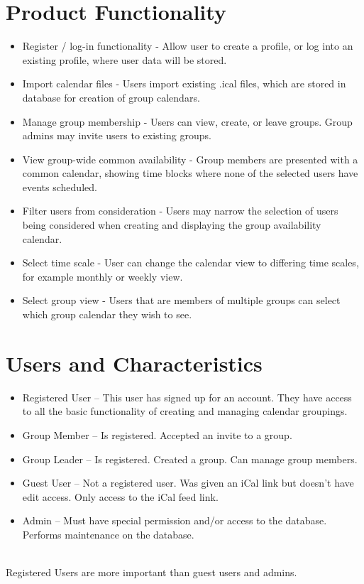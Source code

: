 \documentclass{scrreprt}
\begin{document}
\section{Product Functionality}
\begin{itemize}
\item Register / log-in functionality - Allow user to create a profile, or log
into an existing profile, where user data will be stored.
\item Import calendar files - Users import existing .ical files, which are
stored in database for creation of group calendars.
\item Manage group membership - Users can view, create, or leave groups. Group
admins may invite users to existing groups.
\item View group-wide common availability - Group members are presented with a
common calendar, showing time blocks where none of the selected users have
events scheduled.
\item Filter users from consideration - Users may narrow the selection of users
being considered when creating and displaying the group availability calendar.
\item Select time scale - User can change the calendar view to differing time 
scales, for example monthly or weekly view.
\item Select group view - Users that are members of multiple groups can select
which group calendar they wish to see.
\end{itemize}

\section{Users and Characteristics}
\begin{itemize}
    \item Registered User – This user has signed up for an account. They have access to
all the basic functionality of creating and managing calendar groupings.
    \item Group Member – Is registered. Accepted an invite to a group.
    \item Group Leader – Is registered. Created a group. Can manage group members.
    \item Guest User – Not a registered user. Was given an iCal link but doesn’t have edit
access. Only access to the iCal feed link.
    \item Admin – Must have special permission and/or access to the database. Performs
maintenance on the database.
\end{itemize}
 \\
Registered Users are more important than guest users and admins.
\end{document}
